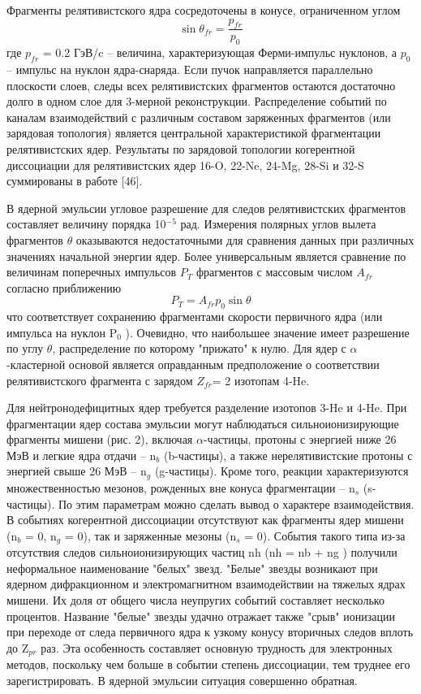 \documentclass[fontsize=14pt]{scrarticle}
\begin{document}
Фрагменты релятивистского ядра сосредоточены в конусе, ограниченном углом
\begin{equation}
    \sin\theta_{fr}=\frac{p_{fr}}{p_{0}}
    \label{1}
\end{equation}
где $p_{fr}$ = 0.2 ГэВ/c – величина, характеризующая Ферми-импульс нуклонов, а $p_{0}$ – импульс на нуклон ядра-снаряда. Если пучок направляется параллельно плоскости слоев, следы всех релятивистских фрагментов остаются достаточно долго в одном слое для 3-мерной реконструкции. Распределение событий по каналам взаимодействий с различным составом заряженных фрагментов (или зарядовая топология) является центральной характеристикой фрагментации релятивистских ядер. Результаты по зарядовой топологии когерентной диссоциации для релятивистских ядер 16-O, 22-Ne, 24-Mg, 28-Si и 32-S суммированы в работе [46].

В ядерной эмульсии угловое разрешение для следов релятивистских фрагментов составляет величину порядка 10$^{-5}$ рад. Измерения полярных углов вылета фрагментов $\theta$ оказываются недостаточными для сравнения данных при различных значениях начальной энергии ядер. Более универсальным является сравнение по величинам поперечных импульсов $P_{T}$ фрагментов с массовым числом $A_{fr}$ согласно приближению
\begin{equation}
    P_{T}=A_{fr}p_{0}\sin\theta
    \label{2}
\end{equation}
что соответствует сохранению фрагментами скорости первичного ядра (или импульса на нуклон P$_{0}$ ). Очевидно, что наибольшее значение имеет разрешение по углу $\theta$, распределение по которому "прижато" к нулю. Для ядер с $\alpha$-кластерной основой является оправданным предположение о соответствии релятивистского фрагмента с зарядом $Z_{fr}$= 2 изотопам 4-He.

Для нейтронодефицитных ядер требуется разделение изотопов 3-He и 4-He. При фрагментации ядер состава эмульсии могут наблюдаться сильноионизирующие фрагменты мишени (рис. 2), включая $\alpha$-частицы, протоны с энергией ниже 26 МэВ и легкие ядра отдачи – n$_{b}$ (b-частицы), а также нерелятивистские протоны с энергией свыше 26 МэВ – n$_{g}$ (g-частицы). Кроме того, реакции характеризуются множественностью мезонов, рожденных вне конуса фрагментации – n$_{s}$ (s-частицы). По этим параметрам можно сделать вывод о характере взаимодействия. В событиях когерентной диссоциации отсутствуют как фрагменты ядер мишени (n$_{b}$ = 0, n$_{g}$ = 0), так и заряженные мезоны (n$_{s}$ = 0). События такого типа из-за отсутствия следов сильноионизирующих частиц nh (nh = nb + ng ) получили неформальное наименование "белых" звезд. "Белые" звезды возникают при ядерном дифракционном и электромагнитном взаимодействии на тяжелых ядрах мишени. Их доля от общего числа неупругих событий составляет несколько процентов. Название "белые" звезды удачно отражает также "срыв" ионизации при переходе от следа первичного ядра к узкому конусу вторичных следов вплоть до Z$_{pr}$ раз. Эта особенность составляет основную трудность для электронных методов, поскольку чем больше в событии степень диссоциации, тем труднее его зарегистрировать. В ядерной эмульсии ситуация совершенно обратная. 	
\end{document}
